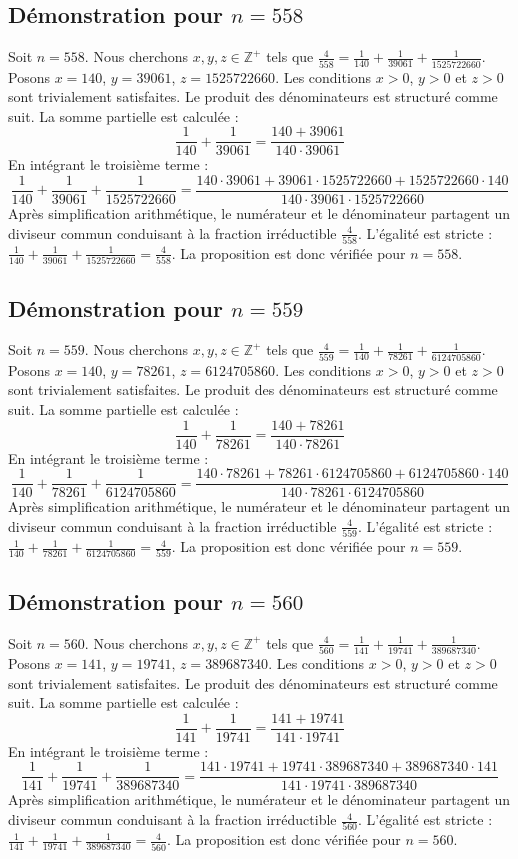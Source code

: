 \documentclass[11pt,a4paper]{article}
\begin{document}
\subsection{Démonstration pour $n = 558$}
Soit $n = 558$. Nous cherchons $x, y, z \in \mathbb{Z}^{+}$ tels que $\frac{4}{558} = \frac{1}{140} + \frac{1}{39061} + \frac{1}{1525722660}$.
Posons $x = 140$, $y = 39061$, $z = 1525722660$.
Les conditions $x > 0$, $y > 0$ et $z > 0$ sont trivialement satisfaites.
Le produit des dénominateurs est structuré comme suit. La somme partielle est calculée :
$$ \frac{1}{140} + \frac{1}{39061} = \frac{140+39061}{140 \cdot 39061} $$
En intégrant le troisième terme :
$$ \frac{1}{140} + \frac{1}{39061} + \frac{1}{1525722660} = \frac{140 \cdot 39061 + 39061 \cdot 1525722660 + 1525722660 \cdot 140}{140 \cdot 39061 \cdot 1525722660} $$
Après simplification arithmétique, le numérateur et le dénominateur partagent un diviseur commun conduisant à la fraction irréductible $\frac{4}{558}$.
L'égalité est stricte : $\frac{1}{140} + \frac{1}{39061} + \frac{1}{1525722660} = \frac{4}{558}$.
La proposition est donc vérifiée pour $n = 558$.
\subsection{Démonstration pour $n = 559$}
Soit $n = 559$. Nous cherchons $x, y, z \in \mathbb{Z}^{+}$ tels que $\frac{4}{559} = \frac{1}{140} + \frac{1}{78261} + \frac{1}{6124705860}$.
Posons $x = 140$, $y = 78261$, $z = 6124705860$.
Les conditions $x > 0$, $y > 0$ et $z > 0$ sont trivialement satisfaites.
Le produit des dénominateurs est structuré comme suit. La somme partielle est calculée :
$$ \frac{1}{140} + \frac{1}{78261} = \frac{140+78261}{140 \cdot 78261} $$
En intégrant le troisième terme :
$$ \frac{1}{140} + \frac{1}{78261} + \frac{1}{6124705860} = \frac{140 \cdot 78261 + 78261 \cdot 6124705860 + 6124705860 \cdot 140}{140 \cdot 78261 \cdot 6124705860} $$
Après simplification arithmétique, le numérateur et le dénominateur partagent un diviseur commun conduisant à la fraction irréductible $\frac{4}{559}$.
L'égalité est stricte : $\frac{1}{140} + \frac{1}{78261} + \frac{1}{6124705860} = \frac{4}{559}$.
La proposition est donc vérifiée pour $n = 559$.
\subsection{Démonstration pour $n = 560$}
Soit $n = 560$. Nous cherchons $x, y, z \in \mathbb{Z}^{+}$ tels que $\frac{4}{560} = \frac{1}{141} + \frac{1}{19741} + \frac{1}{389687340}$.
Posons $x = 141$, $y = 19741$, $z = 389687340$.
Les conditions $x > 0$, $y > 0$ et $z > 0$ sont trivialement satisfaites.
Le produit des dénominateurs est structuré comme suit. La somme partielle est calculée :
$$ \frac{1}{141} + \frac{1}{19741} = \frac{141+19741}{141 \cdot 19741} $$
En intégrant le troisième terme :
$$ \frac{1}{141} + \frac{1}{19741} + \frac{1}{389687340} = \frac{141 \cdot 19741 + 19741 \cdot 389687340 + 389687340 \cdot 141}{141 \cdot 19741 \cdot 389687340} $$
Après simplification arithmétique, le numérateur et le dénominateur partagent un diviseur commun conduisant à la fraction irréductible $\frac{4}{560}$.
L'égalité est stricte : $\frac{1}{141} + \frac{1}{19741} + \frac{1}{389687340} = \frac{4}{560}$.
La proposition est donc vérifiée pour $n = 560$.
\end{document}

